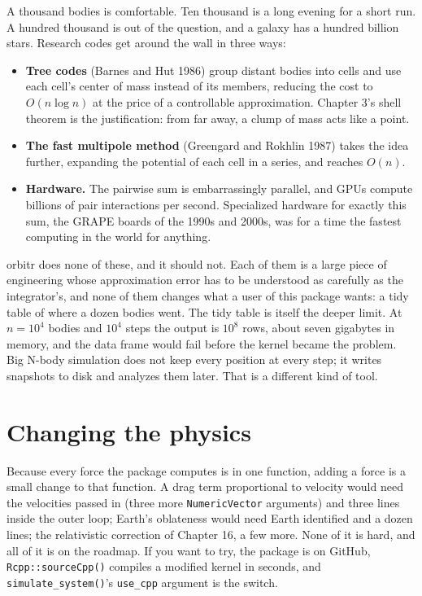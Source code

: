 \documentclass[
  10.5pt,
  letterpaper,
]{scrbook}
\newcounter{none} %
\providecommand{\tightlist}{%
  \setlength{\itemsep}{0pt}\setlength{\parskip}{0pt}}
\theoremstyle{definition}
\theoremstyle{plain}
\theoremstyle{remark}
\begin{document}
A thousand bodies is comfortable. Ten thousand is a long evening for a
short run. A hundred thousand is out of the question, and a galaxy has a
hundred billion stars. Research codes get around the wall in three ways:

\begin{itemize}
\tightlist
\item
  \textbf{Tree codes} (Barnes and Hut 1986) group distant bodies into
  cells and use each cell's center of mass instead of its members,
  reducing the cost to \(O(n\log n)\) at the price of a controllable
  approximation. Chapter 3's shell theorem is the justification: from
  far away, a clump of mass acts like a point.
\item
  \textbf{The fast multipole method} (Greengard and Rokhlin 1987) takes
  the idea further, expanding the potential of each cell in a series,
  and reaches \(O(n)\).
\item
  \textbf{Hardware.} The pairwise sum is embarrassingly parallel, and
  GPUs compute billions of pair interactions per second. Specialized
  hardware for exactly this sum, the GRAPE boards of the 1990s and
  2000s, was for a time the fastest computing in the world for anything.
\end{itemize}

orbitr does none of these, and it should not. Each of them is a large
piece of engineering whose approximation error has to be understood as
carefully as the integrator's, and none of them changes what a user of
this package wants: a tidy table of where a dozen bodies went. The tidy
table is itself the deeper limit. At \(n = 10^4\) bodies and \(10^4\)
steps the output is \(10^8\) rows, about seven gigabytes in memory, and
the data frame would fail before the kernel became the problem. Big
N-body simulation does not keep every position at every step; it writes
snapshots to disk and analyzes them later. That is a different kind of
tool.

\section{Changing the physics}\label{changing-the-physics}

Because every force the package computes is in one function, adding a
force is a small change to that function. A drag term proportional to
velocity would need the velocities passed in (three more
\texttt{NumericVector} arguments) and three lines inside the outer loop;
Earth's oblateness would need Earth identified and a dozen lines; the
relativistic correction of Chapter 16, a few more. None of it is hard,
and all of it is on the roadmap. If you want to try, the package is on
GitHub, \texttt{Rcpp::sourceCpp()} compiles a modified kernel in
seconds, and \texttt{simulate\_system()}'s \texttt{use\_cpp} argument is
the switch.
\end{document}
